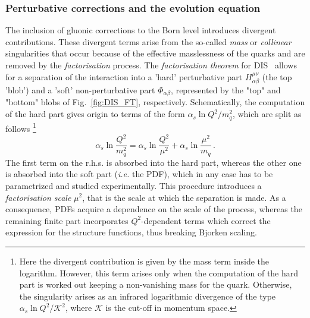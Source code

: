\subsubsection*{Perturbative corrections and the evolution equation}
The inclusion of gluonic corrections to the Born level introduces divergent contributions. These divergent terms arise from the so-called \textit{mass} or \textit{collinear} singularities that occur because of the effective masslessness of the quarks and are removed by the \textit{factorisation} process. The \textit{factorisation theorem} for DIS~\cite{Collins:1989gx} allows for a separation of the interaction into a 'hard' perturbative part $H^{\mu \nu}_{\alpha \beta}$ (the top 'blob') and a 'soft' non-perturbative part $\Phi_{\alpha \beta}$, represented by the "top" and "bottom" blobs of Fig.~\ref{fig:DIS_FT}, respectively. Schematically, the computation of the hard part gives origin to terms of the form $\alpha_{s} \ln Q^2/m_q^2$, which are split as follows
\footnote{Here the divergent contribution is given by the mass term inside the logarithm. However, this term arises only when the computation of the hard part is worked out keeping a non-vanishing mass for the quark. Otherwise, the singularity arises as an infrared logarithmic divergence of the type $\alpha_{s} \ln Q^2/\mathcal{K}^2$, where $\mathcal{K}$ is the cut-off in momentum space.}
\begin{equation}
  \alpha_{s} \ln \frac{Q^2}{m_q^2} = \alpha_{s} \ln \frac{Q^2}{\mu^2} + \alpha_{s} \ln \frac{\mu^2}{m_{q}} \,.
\end{equation}
The first term on the r.h.s. is absorbed into the hard part, whereas the other one is absorbed into the soft part (\textit{i.e.} the PDF), which in any case has to be parametrized and studied experimentally. This procedure introduces a \textit{factorisation scale} $\mu^2$, that is the scale at which the separation is made. As a consequence, PDFs acquire a dependence on the scale of the process, whereas the remaining finite part incorporates $Q^2$-dependent terms which correct the expression for the structure functions, thus breaking Bjorken scaling.%

